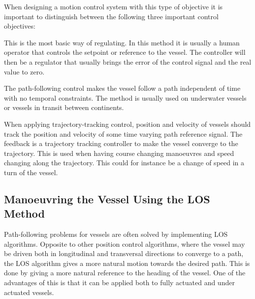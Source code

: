When designing a motion control system with this type of objective it is important to distinguish between the following three important control objectives:
\begin{description}[style=nextline]
	\item [Setpoint Regulation]
	This is the most basic way of regulating. In this method it is usually a human operator that controls the setpoint or reference to the vessel. The controller will then be a regulator that usually brings the error of the control signal and the real value to zero.
	\item [Path-Following Control]
	The path-following control makes the vessel follow a path independent of time with no temporal constraints. The method is usually used on underwater vessels or vessels in transit between continents.
	\item [Trajectory-Tracking Control]
	When applying trajectory-tracking control, position and velocity of vessels should track the position and velocity of some time varying path reference signal. The feedback is a trajectory tracking controller to make the vessel converge to the trajectory. This is used when having course changing manoeuvres and speed changing along the trajectory. This could for instance be a change of speed in a turn of the vessel.
\end{description}

\subsection{Manoeuvring the Vessel Using the LOS Method}
Path-following problems for vessels are often solved by implementing \ac{LOS} algorithms. Opposite to other position control algorithms, where the vessel may be driven both in longitudinal and transversal directions to converge to a path, the \ac{LOS} algorithm gives a more natural motion towards the desired path. This is done by giving a more natural reference to the heading of the vessel. One of the advantages of this is that it can be applied both to fully actuated and under actuated vessels.

